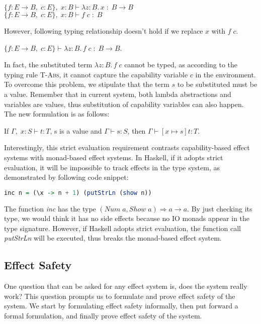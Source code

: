 $\{f: E \to B,\; c:E\},\; x:B \vdash \lambda z:B.\,x \; : \; B \to
  B$ \\
$\{f: E \to B,\; c:E\},\; x:B \vdash f \; c \; : \; B$

However, following typing relationship doesn't hold if we replace
$x$ with $f \; c$.

$\{f: E \to B,\; c:E\} \vdash \lambda z:B.\,f \; c \; : \; B \to B$.

In fact, the substituted term $\lambda z:B.\,f \; c$ cannot be typed,
as according to the typing rule \textsc{T-Abs}, it cannot capture the
capability variable $c$ in the environment. To overcome this problem,
we stipulate that the term $s$ to be substituted must be a
value. Remember that in current system, both lambda abstractions and
variables are values, thus substitution of capability variables can
also happen. The new formulation is as follows:

\begin{lemma}
  If $\Gamma,\; x:S \vdash t : T$, s is a value and
  $\Gamma \vdash s : S$, then $\Gamma \vdash [x \mapsto s]t : T$.
\end{lemma}

Interestingly, this strict evaluation requirement contrasts
capability-based effect systems with monad-based effect systems. In
Haskell, if it adopts strict evaluation, it will be impossible to
track effects in the type system, as demonstrated by following code
snippet:

\begin{lstlisting}[language=Haskell]
  inc n = (\x -> n + 1) (putStrLn (show n))
\end{lstlisting}

The function \emph{inc} has the type
$(Num\;a, Show\;a) \Rightarrow a \to a$. By just checking its type, we
would think it has no side effects because no IO monads appear in the
type signature. However, if Haskell adopts strict evaluation, the
function call \emph{putStrLn} will be executed, thus breaks the
monad-based effect system.

\subsection{Effect Safety}

One question that can be asked for any effect system is, does the
system really work? This question prompts us to formulate and prove
effect safety of the system. We start by formulating effect safety
informally, then put forward a formal formulation, and finally prove
effect safety of the system.

